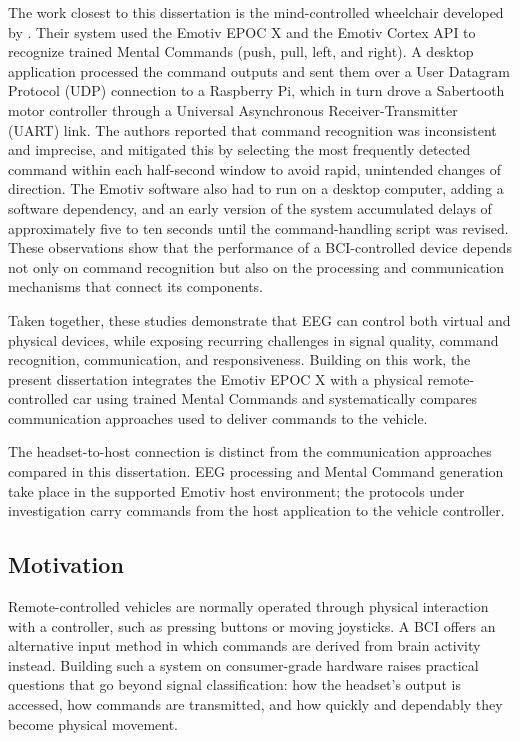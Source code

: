 The work closest to this dissertation is the mind-controlled wheelchair developed by \citet{stoyell2022wheelchair}. Their system used the Emotiv EPOC X and the Emotiv Cortex API to recognize trained Mental Commands (push, pull, left, and right). A desktop application processed the command outputs and sent them over a User Datagram Protocol (UDP) connection to a Raspberry Pi, which in turn drove a Sabertooth motor controller through a Universal Asynchronous Receiver-Transmitter (UART) link. The authors reported that command recognition was inconsistent and imprecise, and mitigated this by selecting the most frequently detected command within each half-second window to avoid rapid, unintended changes of direction. The Emotiv software also had to run on a desktop computer, adding a software dependency, and an early version of the system accumulated delays of approximately five to ten seconds until the command-handling script was revised. These observations show that the performance of a BCI-controlled device depends not only on command recognition but also on the processing and communication mechanisms that connect its components.

Taken together, these studies demonstrate that EEG can control both virtual and physical devices, while exposing recurring challenges in signal quality, command recognition, communication, and responsiveness. Building on this work, the present dissertation integrates the Emotiv EPOC X with a physical remote-controlled car using trained Mental Commands and systematically compares communication approaches used to deliver commands to the vehicle.

The headset-to-host connection is distinct from the communication approaches compared in this dissertation. EEG processing and Mental Command generation take place in the supported Emotiv host environment; the protocols under investigation carry commands from the host application to the vehicle controller.

\subsection{Motivation}

Remote-controlled vehicles are normally operated through physical interaction with a controller, such as pressing buttons or moving joysticks. A BCI offers an alternative input method in which commands are derived from brain activity instead. Building such a system on consumer-grade hardware raises practical questions that go beyond signal classification: how the headset's output is accessed, how commands are transmitted, and how quickly and dependably they become physical movement.

